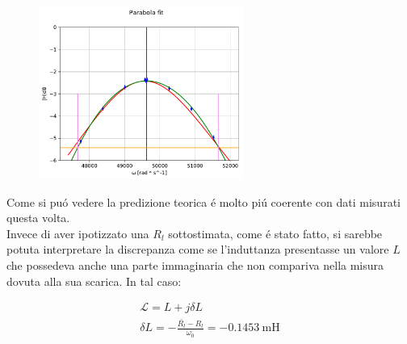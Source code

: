 \documentclass{article}
\begin{document}
\begin{figure}[h]
\centering
\includegraphics[width=0.6\textwidth]{bodeconf.pdf}
\label{fig:bodeconfr}
\end{figure}
 
Come si pu\'o vedere la predizione teorica \'e molto pi\'u coerente con dati misurati questa volta. \\

Invece di aver ipotizzato una $R_l$ sottostimata, come \'e stato fatto, si sarebbe potuta interpretare la discrepanza come se l'induttanza presentasse un valore $L$ che possedeva anche una parte immaginaria che non compariva nella misura dovuta alla sua scarica.
In tal caso:

\begin{gather}
	\mathcal{L} = L + j\delta L \\
	\delta L = - \frac{\bar{R_l} - R_l}{\omega_0} = - 0.1453 \ \si{\milli\henry}
\end{gather}
\end{document}
